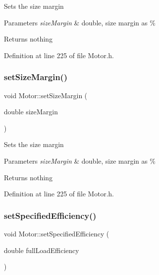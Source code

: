 Sets the size margin


\begin{DoxyParams}{Parameters}
{\em size\+Margin} & double, size margin as \%\\
\hline
\end{DoxyParams}
\begin{DoxyReturn}{Returns}
nothing 
\end{DoxyReturn}


Definition at line 225 of file Motor.\+h.

\mbox{\label{class_motor_ab39a9375d17af151b6f9516674f37928}} 
\subsubsection{\texorpdfstring{set\+Size\+Margin()}{setSizeMargin()}\hspace{0.1cm}{\footnotesize\ttfamily [3/3]}}
{\footnotesize\ttfamily void Motor\+::set\+Size\+Margin (\begin{DoxyParamCaption}\item[{double}]{size\+Margin }\end{DoxyParamCaption})\hspace{0.3cm}{\ttfamily [inline]}}

Sets the size margin


\begin{DoxyParams}{Parameters}
{\em size\+Margin} & double, size margin as \%\\
\hline
\end{DoxyParams}
\begin{DoxyReturn}{Returns}
nothing 
\end{DoxyReturn}


Definition at line 225 of file Motor.\+h.

\mbox{\label{class_motor_a0a096ec5fc2b7e8ee40b4e7b30e5f337}} 
\subsubsection{\texorpdfstring{set\+Specified\+Efficiency()}{setSpecifiedEfficiency()}\hspace{0.1cm}{\footnotesize\ttfamily [1/3]}}
{\footnotesize\ttfamily void Motor\+::set\+Specified\+Efficiency (\begin{DoxyParamCaption}\item[{double}]{full\+Load\+Efficiency }\end{DoxyParamCaption})\hspace{0.3cm}{\ttfamily [inline]}}

